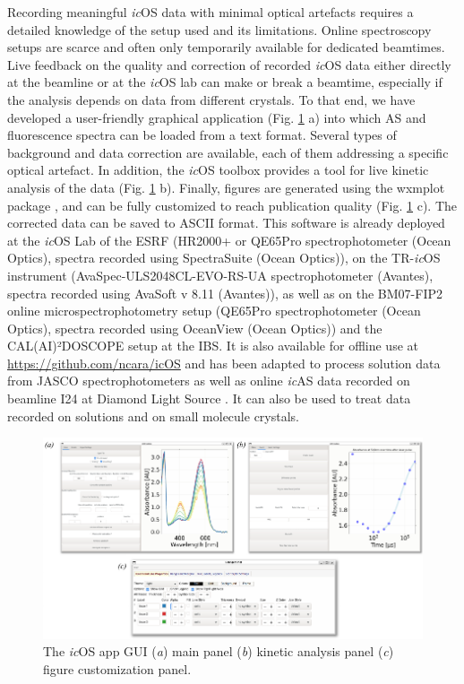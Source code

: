 Recording meaningful \textit{ic}OS data with minimal optical artefacts requires a detailed knowledge of the setup used and its limitations. Online spectroscopy setups are scarce and often only temporarily available for dedicated beamtimes. Live feedback on the quality and correction of recorded \textit{ic}OS data either directly at the beamline or at the \textit{ic}OS lab can make or break a beamtime, especially if the analysis depends on data from different crystals. To that end, we have developed a user-friendly graphical application (Fig. \ref{fig:toolbox_GUI} a) into which AS and fluorescence spectra can be loaded from a text format. Several types of background and data correction are available, each of them addressing a specific optical artefact. In addition, the \textit{ic}OS toolbox provides a tool for live kinetic analysis of the data (Fig. \ref{fig:toolbox_GUI} b). Finally, figures are generated using the wxmplot package \parencite{newvilleNewvilleWxmplot2024}, and can be fully customized to reach publication quality (Fig. \ref{fig:toolbox_GUI} c).  The corrected data can be saved to ASCII format. This software is already deployed at the \textit{ic}OS Lab of the ESRF (HR2000+ or QE65Pro spectrophotometer (Ocean Optics), spectra recorded using SpectraSuite (Ocean Optics)), on the TR-\textit{ic}OS instrument \parencite{engilbergeTRicOSSetupESRF2024} (AvaSpec-ULS2048CL-EVO-RS-UA spectrophotometer (Avantes), spectra recorded using AvaSoft v 8.11 (Avantes)), as well as on the BM07-FIP2 online microspectrophotometry setup (QE65Pro spectrophotometer (Ocean Optics), spectra recorded using OceanView (Ocean Optics)) and the CAL(AI)²DOSCOPE setup at the IBS. It is also available for offline use at \url{https://github.com/ncara/icOS} and has been adapted to process solution data from JASCO spectrophotometers as well as online \textit{ic}AS data recorded on beamline I24 at Diamond Light Source \parencite{roseSpectroscopicallyValidatedPHdependent2024}. It can also be used to treat data recorded on solutions and on small molecule crystals.


\begin{figure}[H] %
    \centering
    \noindent \includegraphics[width=\textwidth]{images/Spectroscopy/icOS_toolbox_Fig.2.pdf}
    \hfill
    \caption{The \textit{ic}OS app GUI (\textit{a}) main panel (\textit{b}) kinetic analysis panel (\textit{c}) figure customization panel.}
    \label{fig:toolbox_GUI}
\end{figure}

